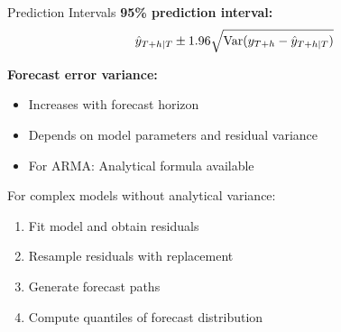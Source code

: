 \documentclass[aspectratio=169]{beamer}
\begin{document}
\begin{frame}{Prediction Intervals}
  \textbf{95\% prediction interval:}
  \begin{equation}
    \hat{y}_{T+h|T} \pm 1.96 \sqrt{\operatorname{Var}(y_{T+h} - \hat{y}_{T+h|T})}
  \end{equation}

  \vspace{0.5em}

  \textbf{Forecast error variance:}
  \begin{itemize}
    \item Increases with forecast horizon
    \item Depends on model parameters and residual variance
    \item For ARMA: Analytical formula available
  \end{itemize}

  \vspace{0.5em}

  \begin{alertbox}[title={Bootstrap Prediction Intervals}]
    For complex models without analytical variance:
    \begin{enumerate}
      \item Fit model and obtain residuals
      \item Resample residuals with replacement
      \item Generate forecast paths
      \item Compute quantiles of forecast distribution
    \end{enumerate}
  \end{alertbox}
\end{frame}
\end{document}
